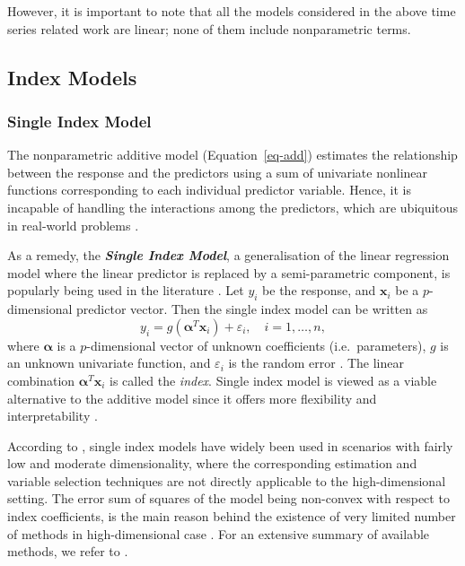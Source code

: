 \documentclass[11pt,a4paper,]{article}
\begin{document}
However, it is important to note that all the models considered in the
above time series related work are linear; none of them include
nonparametric terms.

\hypertarget{sec-Index}{%
\subsection{Index Models}\label{sec-Index}}

\hypertarget{single-index-model}{%
\subsubsection{Single Index Model}\label{single-index-model}}

The nonparametric additive model (Equation~\ref{eq-add}) estimates the
relationship between the response and the predictors using a sum of
univariate nonlinear functions corresponding to each individual
predictor variable. Hence, it is incapable of handling the interactions
among the predictors, which are ubiquitous in real-world problems
\autocite{Zhang2008}.

As a remedy, the \textbf{\emph{Single Index Model}}, a generalisation of
the linear regression model where the linear predictor is replaced by a
semi-parametric component, is popularly being used in the literature
\autocite{Radchenko2015}. Let \(y_{i}\) be the response, and
\(\bm{x}_{i}\) be a \(p\)-dimensional predictor vector. Then the single
index model can be written as \[
  y_{i} = g \left ( \bm{\alpha}^{T} \bm{x}_{i} \right ) + \varepsilon_{i}, \quad i = 1, \dots, n,
\] where \(\bm{\alpha}\) is a \(p\)-dimensional vector of unknown
coefficients (i.e.~parameters), \(g\) is an unknown univariate function,
and \(\varepsilon_{i}\) is the random error
\autocite{Stoker1986,Hardle1993}. The linear combination
\(\bm{\alpha}^{T} \bm{x}_{i}\) is called the \emph{index}. Single index
model is viewed as a viable alternative to the additive model since it
offers more flexibility and interpretability \autocite{Radchenko2015}.

According to \textcite{Radchenko2015}, single index models have widely
been used in scenarios with fairly low and moderate dimensionality,
where the corresponding estimation and variable selection techniques are
not directly applicable to the high-dimensional setting. The error sum
of squares of the model being non-convex with respect to index
coefficients, is the main reason behind the existence of very limited
number of methods in high-dimensional case \autocite{Radchenko2015}. For
an extensive summary of available methods, we refer to
\textcite{Radchenko2015}.
\end{document}
